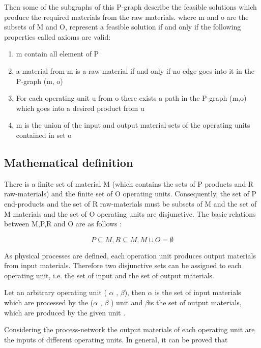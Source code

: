 Then some of the subgraphs of this P-graph describe the feasible solutions which produce the required materials from the raw materials.   \cite{pns3}
where m and o are the subsets of M and O, represent a feasible solution if and only if the following properties called axioms are valid: 
\begin{enumerate}

\item m contain all element of P    
\item a material from m is a raw material if and only if no edge goes into it in the P-graph (m, o)  
\item For each operating unit u from o there exists a path in the P-graph (m,o) which goes into a desired product from u  
\item m is the union of the input and output material sets of the operating units contained 
in set o  
 
\end{enumerate}

\subsection{Mathematical definition }

There is a finite set of material M (which contains the sets of P products and R raw-materials) 
and the finite set of O operating units. \cite{pns2} 
Consequently, the set of P end-products and the set of R raw-materials must be subsets of M 
and the set of M materials and the set of O operating units are disjunctive.
The basic relations between M,P,R and O are as follows : 

\begin{equation}
P\subseteq M,R\subseteq M,M\cup O=\emptyset\label{eq:1}
\end{equation}

As physical processes are defined, each operation unit produces output materials from
input materials. Therefore two disjunctive sets can be assigned to each operating unit, i.e. the set of input and the set of output materials. 

Let an arbitrary operating unit ( $\alpha$ , $\beta$), then $\alpha$ is the set of input materials which are processed by the 
($\alpha$ , $\beta$ ) unit and $\beta$is the set of output materials, which are produced by the given unit .


Considering the process-network the output materials of each operating unit are the inputs of different operating units. In general, it can be proved that 

